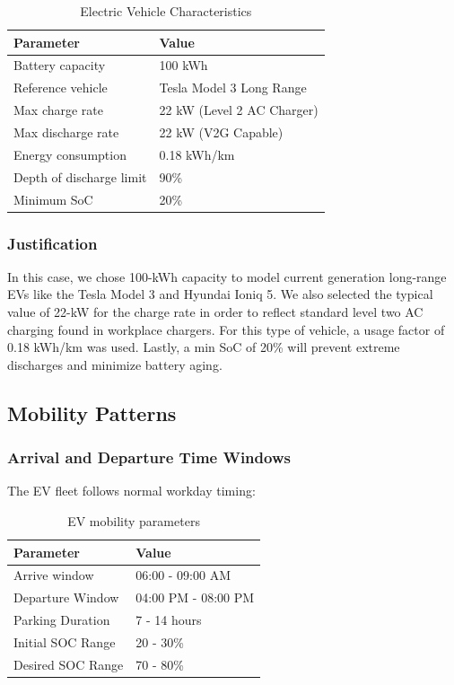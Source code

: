 \begin{table}[H]
\centering
\caption{Electric Vehicle Characteristics}
\label{tab:ev_specs}
\begin{tabular}{@{}ll@{}}
\toprule
\textbf{Parameter} & \textbf{Value} \\
\midrule
Battery capacity & 100 kWh \\
Reference vehicle & Tesla Model 3 Long Range \\
Max charge rate & 22 kW (Level 2 AC Charger) \\
Max discharge rate & 22 kW (V2G Capable) \\
Energy consumption & 0.18 kWh/km \\
Depth of discharge limit & 90\% \\
Minimum SoC & 20\% \\
\bottomrule
\end{tabular}
\end{table}

\subsubsection{Justification}

In this case, we chose 100-kWh capacity to model current generation long-range EVs like the Tesla Model 3 and Hyundai Ioniq 5. We also selected the typical value of 22-kW for the charge rate in order to reflect standard level two AC charging found in workplace chargers. For this type of vehicle, a usage factor of 0.18 kWh/km was used. Lastly, a min SoC of 20\% will prevent extreme discharges and minimize battery aging.

\subsection{Mobility Patterns}
\label{subsec:mobility_patterns}

\subsubsection{Arrival and Departure Time Windows}
\label{subsec:mobility_arrival_departure_windows}

The EV fleet follows normal workday timing:

\begin{table}[H]
\centering
\caption{EV mobility parameters}
\label{tab:mobility}
\begin{tabular}{@{}ll@{}}
\toprule
\textbf{Parameter} & \textbf{Value} \\
\midrule
Arrive window & 06:00 - 09:00 AM \\
Departure Window & 04:00 PM - 08:00 PM \\
Parking Duration & 7 - 14 hours \\
Initial SOC Range & 20 - 30\% \\
Desired SOC Range & 70 - 80\% \\
\bottomrule
\end{tabular}
\end{table}

